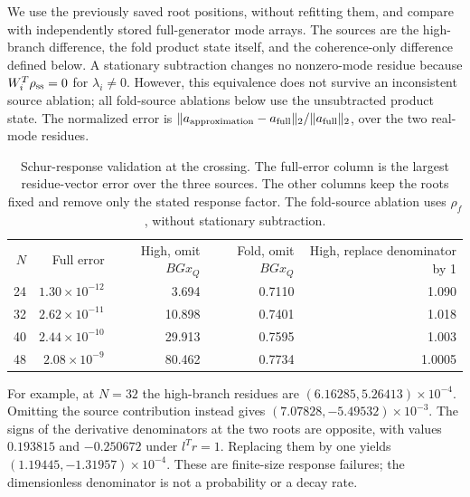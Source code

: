 \documentclass[aps,pra,10pt,onecolumn,superscriptaddress,amsmath,amssymb]{revtex4-2}
\begin{document}
We use the previously saved root positions, without refitting them, and compare with independently stored full-generator mode arrays. The sources are the high-branch difference, the fold product state itself, and the coherence-only difference defined below. A stationary subtraction changes no nonzero-mode residue because $W_i^T\rho_{\rm ss}=0$ for $\lambda_i\ne0$. However, this equivalence does not survive an inconsistent source ablation; all fold-source ablations below use the unsubtracted product state. The normalized error is $\|a_{\rm approximation}-a_{\rm full}\|_2/\|a_{\rm full}\|_2$, over the two real-mode residues.

\begin{table}[ht]
\caption{Schur-response validation at the crossing. The full-error column is the largest residue-vector error over the three sources. The other columns keep the roots fixed and remove only the stated response factor. The fold-source ablation uses $\rho_f$, without stationary subtraction.}
\label{tab:source}
\begin{ruledtabular}
\begin{tabular}{rrrrr}
$N$&Full error&High, omit $BGx_Q$&Fold, omit $BGx_Q$&High, replace denominator by 1\\
24&$1.30\times10^{-12}$&3.694&0.7110&1.090\\
32&$2.62\times10^{-11}$&10.898&0.7401&1.018\\
40&$2.44\times10^{-10}$&29.913&0.7595&1.003\\
48&$2.08\times10^{-9}$&80.462&0.7734&1.0005
\end{tabular}
\end{ruledtabular}
\end{table}

For example, at $N=32$ the high-branch residues are $(6.16285,5.26413)\times10^{-4}$. Omitting the source contribution instead gives $(7.07828,-5.49532)\times10^{-3}$. The signs of the derivative denominators at the two roots are opposite, with values $0.193815$ and $-0.250672$ under $l^Tr=1$. Replacing them by one yields $(1.19445,-1.31957)\times10^{-4}$. These are finite-size response failures; the dimensionless denominator is not a probability or a decay rate.
\end{document}

